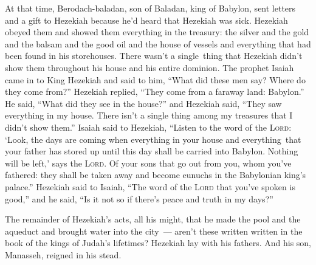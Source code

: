\begin{inparaenum}
     At that time, Berodach-baladan, son of Baladan, king of Babylon, sent letters and a gift to Hezekiah because he'd heard that Hezekiah was sick.%
     Hezekiah obeyed them and showed them everything in the treasury: the silver and the gold and the balsam and the good oil and the house of vessels and everything that had been found in his storehouses. There wasn't a single\understood\ thing that Hezekiah didn't show them throughout his house and his entire dominion.%
     The prophet Isaiah came in to King Hezekiah and said to him, ``What did these men say? Where do they come from?'' Hezekiah replied, ``They come from a faraway land: Babylon.''%
     He said, ``What did they see in the house?'' and Hezekiah said, ``They saw everything in my house. There isn't a single thing among my treasures that I didn't show them.''%
     Isaiah said to Hezekiah, ``Listen to the word of the \textsc{Lord}:%
     `Look, the days are coming when everything in your house and everything\understood\ that your father has stored up until this day shall be carried into Babylon. Nothing will be left,' says the \textsc{Lord}.%
     Of your sons that go out from you, whom you've fathered: they shall be taken away and become eunuchs in the Babylonian king's palace.''%
     Hezekiah said to Isaiah, ``The word of the \textsc{Lord} that you've spoken is good,'' and he said, ``Is it not so if there's peace and truth in my days?''%
    
     The remainder of Hezekiah's acts, all his might, that he made the pool and the aqueduct and brought water into the city~--- aren't these written written in the book of the kings of Judah's lifetimes?%
     Hezekiah lay with his fathers. And his son, Manasseh, reigned in his stead.%
\end{inparaenum}
